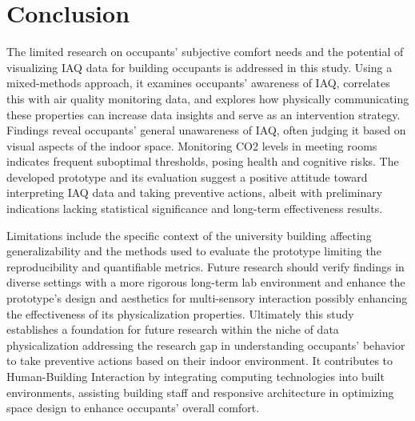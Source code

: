 \section{Conclusion}
\label{sec:conclusion}

The limited research on occupants' subjective comfort needs and the potential of visualizing IAQ data for building occupants is addressed in this study. Using a mixed-methods approach, it examines occupants' awareness of IAQ, correlates this with air quality monitoring data, and explores how physically communicating these properties can increase data insights and serve as an intervention strategy. Findings reveal occupants' general unawareness of IAQ, often judging it based on visual aspects of the indoor space. Monitoring CO2 levels in meeting rooms indicates frequent suboptimal thresholds, posing health and cognitive risks. The developed prototype and its evaluation suggest a positive attitude toward interpreting IAQ data and taking preventive actions, albeit with preliminary indications lacking statistical significance and long-term effectiveness results. 

Limitations include the specific context of the university building affecting generalizability and the methods used to evaluate the prototype limiting the reproducibility and quantifiable metrics. Future research should verify findings in diverse settings with a more rigorous long-term lab environment and enhance the prototype's design and aesthetics for multi-sensory interaction possibly enhancing the effectiveness of its physicalization properties. Ultimately this study establishes a foundation for future research within the niche of data physicalization addressing the research gap in understanding occupants' behavior to take preventive actions based on their indoor environment.  It contributes to Human-Building Interaction by integrating computing technologies into built environments, assisting building staff and responsive architecture in optimizing space design to enhance occupants' overall comfort.
